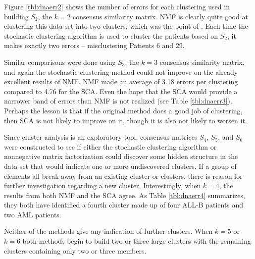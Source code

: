 \documentclass[final]{siamltex}
\begin{document}
Figure \ref{tbl:dnaerr2} shows the number of errors for each clustering used in building $S_{2}$, the $k=2$ consensus similarity matrix. NMF is clearly quite good at clustering this data set into two clusters, which was the point of \cite{metagene}. Each time the stochastic clustering algorithm is used to cluster the patients based on $S_{2}$, it  makes exactly two errors -- misclustering Patients 6 and 29. 

Similar comparisons were done using $S_{3}$, the $k=3$ consensus similarity matrix, and again the stochastic clustering method could not improve on the already excellent results of NMF. 
NMF made an average of 3.18 errors per clustering compared to 4.76 for the SCA. Even the hope that the SCA would provide a narrower band of errors than NMF is not realized (see Table \ref{tbl:dnaerr3}). Perhaps the lesson is that if the original method does a good job of clustering, then SCA is not likely to improve on it, though it is also not likely to worsen it. 

Since cluster analysis is an exploratory tool, consensus matrices $S_{4}$, $S_{5}$, and $S_{6}$ were constructed to see if either the stochastic clustering algorithm or nonnegative matrix factorization could discover some hidden structure in the data set that would indicate one or more undiscovered clusters. If a group of elements all break away from an existing cluster or clusters, there is reason for further investigation regarding a new cluster. Interestingly, when $k=4$, the results from both NMF and the SCA agree. As Table \ref{tbl:dnaerr4} summarizes, they both have identified a fourth cluster made up of four ALL-B patients and two AML patients.

Neither of the methods give any indication of further clusters. When $k=5$ or $k=6$ both methods begin to build two or three large clusters with the remaining clusters containing only two or three members.
\end{document}
